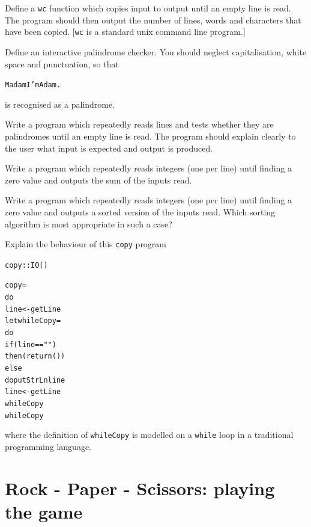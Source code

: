 \begin{exercises}

\item
Define a \texttt{wc} function which copies input to output until an empty line is read. The program should then output the number of lines, words and characters that have been copied. [\texttt{wc} is a standard unix command line program.]

\item
Define an interactive palindrome checker. You should neglect capitalisation, white space and punctuation, so that
\begin{alltt}
Madam I'm Adam.
\end{alltt}
is recognised as a palindrome.

\item
Write a program which repeatedly reads lines and tests whether they are
palindromes until an empty line is read. The program should explain
clearly to the user what input is expected and output is produced.

\item
Write a program which repeatedly reads integers (one per line) until finding
a zero value and
outputs the sum of the inputs read. 
\item
Write a program which repeatedly reads integers (one per line) until finding
a zero value and
outputs a sorted version of the inputs read. Which sorting algorithm is
most appropriate in such a case?


\item
Explain the behaviour of this \texttt{copy} program
\begin{alltt}
copy :: IO ()

copy =
    do
      line <- getLine
      let whileCopy = 
              do
                if (line == "")
                  then (return ())
                  else 
                    do putStrLn line
                       line <- getLine
                       whileCopy 
      whileCopy
\end{alltt}
where the definition of \texttt{whileCopy} is modelled on a \texttt{while} loop in a traditional programming language.
\end{exercises} 






\section{Rock - Paper - Scissors: playing the game}
\label{playingRPS}


